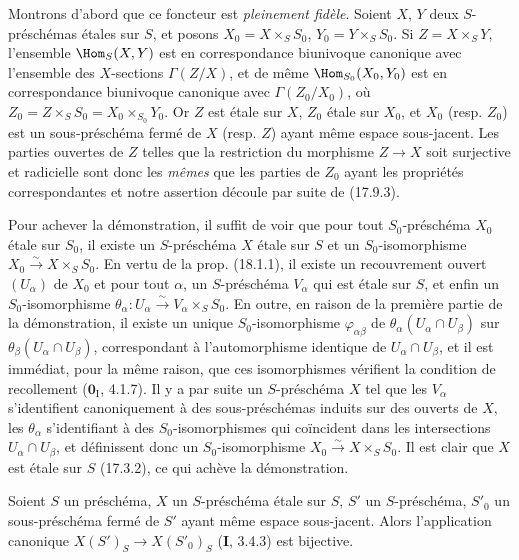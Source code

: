 Montrons d'abord que ce foncteur est \emph{pleinement fidèle}. Soient $X$, $Y$ deux $S$-préschémas étales sur $S$, et posons $X_0=X\times_S S_0$, $Y_0=Y\times_S S_0$. Si $Z=X\times_S Y$, l'ensemble $\Hom_S(X,Y)$ est en correspondance biunivoque canonique avec l'ensemble des $X$-sections $\Gamma(Z/X)$, et de même $\Hom_{S_0}(X_0,Y_0)$ est en correspondance biunivoque canonique avec $\Gamma(Z_0/X_0)$, où $Z_0=Z\times_S S_0=X_0\times_{S_0}Y_0$. Or $Z$ est étale sur $X$, $Z_0$ étale sur $X_0$, et $X_0$ (resp. $Z_0$) est un sous-préschéma fermé de $X$ (resp. $Z$) ayant même espace sous-jacent. Les parties ouvertes de $Z$ telles que la restriction du morphisme $Z\to X$ soit surjective et radicielle sont donc les \emph{mêmes} que les parties de $Z_0$ ayant les propriétés correspondantes et notre assertion découle par suite de (17.9.3).

Pour achever la démonstration, il suffit de voir que pour tout $S_0$-préschéma $X_0$ étale sur $S_0$, il existe un $S$-préschéma $X$ étale sur $S$ et un $S_0$-isomorphisme $X_0\xrightarrow{\sim}X\times_S S_0$. En vertu de la prop. (18.1.1), il existe un recouvrement ouvert $(U_\alpha)$ de $X_0$ et pour tout $\alpha$, un $S$-préschéma $V_\alpha$ qui est étale sur $S$, et enfin un $S_0$-isomorphisme $\theta_\alpha:U_\alpha\xrightarrow{\sim}V_\alpha\times_S S_0$. En outre, en raison de la première partie de la démonstration, il existe un unique $S_0$-isomorphisme $\varphi_{\alpha\beta}$ de $\theta_\alpha(U_\alpha\cap U_\beta)$ sur $\theta_\beta(U_\alpha\cap U_\beta)$, correspondant à l'automorphisme identique de $U_\alpha\cap U_\beta$, et il est immédiat, pour la même raison, que ces isomorphismes vérifient la condition de recollement ($\mathbf{0}_{\mathrm I}$, 4.1.7). Il y a par suite un $S$-préschéma $X$ tel que les $V_\alpha$ s'identifient canoniquement à des sous-préschémas induits sur des ouverts de $X$, les $\theta_\alpha$ s'identifiant à des $S_0$-isomorphismes qui coïncident dans les intersections $U_\alpha\cap U_\beta$, et définissent donc un $S_0$-isomorphisme $X_0\xrightarrow{\sim}X\times_S S_0$. Il est clair que $X$ est étale sur $S$ (17.3.2), ce qui achève la démonstration.

\begin{corollary}[18.1.3]
\label{IV.18.1.3}
Soient $S$ un préschéma, $X$ un $S$-préschéma étale sur $S$, $S'$ un $S$-préschéma, $S'_0$ un sous-préschéma fermé de $S'$ ayant même espace sous-jacent. Alors l'application canonique $X(S')_S\to X(S'_0)_S$ \textup{(\textbf{I}, 3.4.3)} est bijective.
\end{corollary}

